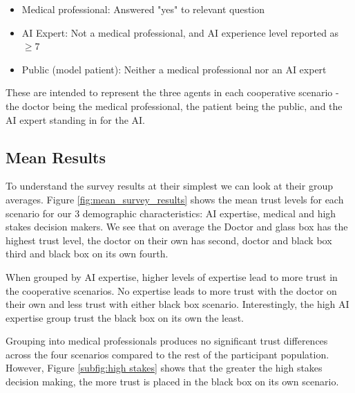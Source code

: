 \documentclass[manuscript,screen,review]{acmart}
\begin{document}
\begin{itemize}
    \item Medical professional: Answered "yes" to relevant question
    \item AI Expert: Not a medical professional, and AI experience level reported as $\geq 7$
    \item Public (model patient): Neither a medical professional nor an AI expert
\end{itemize}

These are intended to represent the three agents in each cooperative scenario - the doctor being the medical professional, the patient being the public, and the AI expert standing in for the AI.

\subsection{Mean Results}

To understand the survey results at their simplest we can look at their group averages. Figure \ref{fig:mean_survey_results} shows the mean trust levels for each scenario for our 3 demographic characteristics: AI expertise, medical and high stakes decision makers. We see that on average the Doctor and glass box has the highest trust level, the doctor on their own has second, doctor and black box third and black box on its own fourth. 

When grouped by AI expertise, higher levels of expertise lead to more trust in the cooperative scenarios. No expertise leads to more trust with the doctor on their own and less trust with either black box scenario. Interestingly, the high AI expertise group trust the black box on its own the least. 

Grouping into medical professionals produces no significant trust differences across the four scenarios compared to the rest of the participant population. However, Figure \ref{subfig:high stakes} shows that the greater the high stakes decision making, the more trust is placed in the black box on its own scenario.
\end{document}
